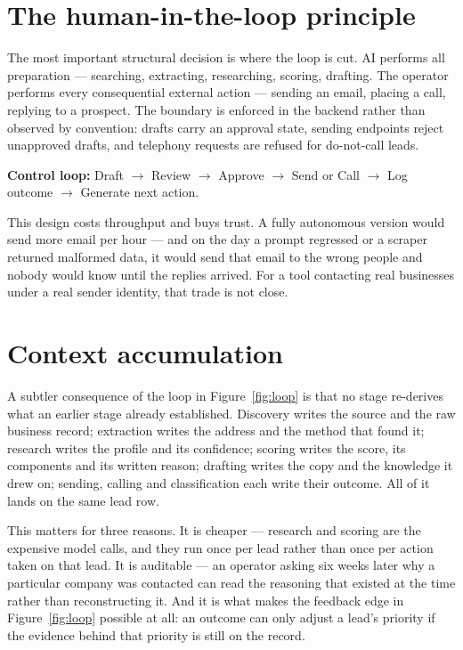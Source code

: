 \documentclass[11pt,a4paper]{report}
\begin{document}
\section{The human-in-the-loop principle}
The most important structural decision is where the loop is cut. AI performs all preparation --- searching, extracting, researching, scoring, drafting. The operator performs every consequential external action --- sending an email, placing a call, replying to a prospect. The boundary is enforced in the backend rather than observed by convention: drafts carry an approval state, sending endpoints reject unapproved drafts, and telephony requests are refused for do-not-call leads.

\begin{infobox}
\textbf{Control loop:} Draft $\rightarrow$ Review $\rightarrow$ Approve $\rightarrow$ Send or Call $\rightarrow$ Log outcome $\rightarrow$ Generate next action.
\end{infobox}

This design costs throughput and buys trust. A fully autonomous version would send more email per hour --- and on the day a prompt regressed or a scraper returned malformed data, it would send that email to the wrong people and nobody would know until the replies arrived. For a tool contacting real businesses under a real sender identity, that trade is not close.

\section{Context accumulation}
A subtler consequence of the loop in Figure~\ref{fig:loop} is that no stage re-derives what an earlier stage already established. Discovery writes the source and the raw business record; extraction writes the address and the method that found it; research writes the profile and its confidence; scoring writes the score, its components and its written reason; drafting writes the copy and the knowledge it drew on; sending, calling and classification each write their outcome. All of it lands on the same lead row.

This matters for three reasons. It is cheaper --- research and scoring are the expensive model calls, and they run once per lead rather than once per action taken on that lead. It is auditable --- an operator asking six weeks later why a particular company was contacted can read the reasoning that existed at the time rather than reconstructing it. And it is what makes the feedback edge in Figure~\ref{fig:loop} possible at all: an outcome can only adjust a lead's priority if the evidence behind that priority is still on the record.
\end{document}
